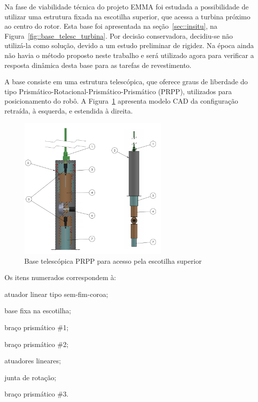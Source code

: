Na fase de viabilidade técnica do projeto EMMA foi estudada a possibilidade de
utilizar uma estrutura fixada na escotilha superior, que acessa a turbina
próximo ao centro do rotor.
Esta base foi apresentada na seção~\ref{sec::insitu}, na
Figura~\ref{fig::base_telesc_turbina}. Por decisão conservadora, decidiu-se não
utilizá-la como solução, devido a um estudo preliminar de rigidez. Na época
ainda não havia o método proposto neste trabalho e será utilizado agora para
verificar a resposta dinâmica desta base para as tarefas de revestimento.

A base consiste em uma estrutura telescópica, que oferece graus de liberdade do
tipo Prismático-Rotacional-Prismático-Prismático (PRPP), utilizados para
posicionamento do robô.
A Figura~\ref{fig::base_telesc} apresenta modelo CAD da configuração retraída, à
esquerda, e estendida à direita.

\begin{figure}[h]
	\centering 
 	\includegraphics[width=0.65\textwidth]{figs/base_telesc}
 	\caption{Base telescópica PRPP para acesso pela escotilha superior}
 	\label{fig::base_telesc}
\end{figure}

Os itens numerados correspondem à: 
%
\begin{enumerate*}[label=(\arabic*)]
  \item atuador linear tipo sem-fim-coroa;
  \item base fixa na escotilha;
  \item braço prismático \#1;
  \item braço prismático \#2;
  \item atuadores lineares;
  \item junta de rotação;
  \item braço prismático \#3.
\end{enumerate*}
%

